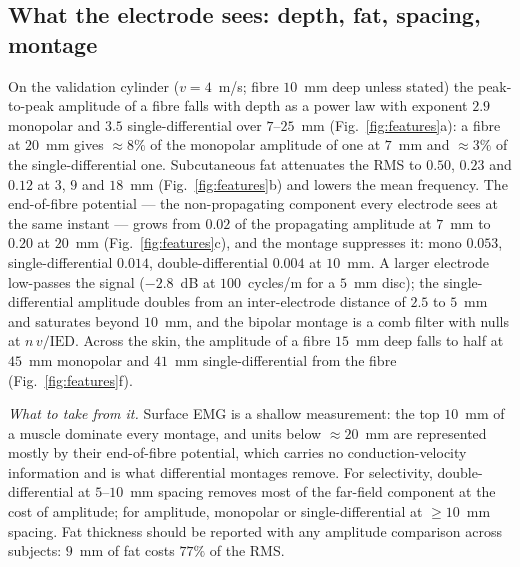 \documentclass[11pt,a4paper]{article}
\begin{document}
\subsection{What the electrode sees: depth, fat, spacing, montage}
\label{sec:study-electrode}
On the validation cylinder ($v = 4$~m/s; fibre $10$~mm deep unless stated) the
peak-to-peak amplitude of a fibre falls with depth as a power law with exponent $2.9$
monopolar and $3.5$ single-differential over $7$--$25$~mm (Fig.~\ref{fig:features}a): a
fibre at $20$~mm gives $\approx8\%$ of the monopolar amplitude of one at $7$~mm and
$\approx3\%$ of the single-differential one. Subcutaneous fat attenuates the RMS to
$0.50$, $0.23$ and $0.12$ at $3$, $9$ and $18$~mm (Fig.~\ref{fig:features}b) and lowers
the mean frequency. The end-of-fibre potential --- the non-propagating component every
electrode sees at the same instant --- grows from $0.02$ of the propagating amplitude at
$7$~mm to $0.20$ at $20$~mm (Fig.~\ref{fig:features}c), and the montage suppresses it:
mono $0.053$, single-differential $0.014$, double-differential $0.004$ at $10$~mm. A
larger electrode low-passes the signal ($-2.8$~dB at $100$~cycles/m for a $5$~mm disc);
the single-differential amplitude doubles from an inter-electrode distance of $2.5$ to
$5$~mm and saturates beyond $10$~mm, and the bipolar montage is a comb filter with nulls
at $n\,v/\mathrm{IED}$. Across the skin, the amplitude of a fibre $15$~mm deep falls to
half at $45$~mm monopolar and $41$~mm single-differential from the fibre
(Fig.~\ref{fig:features}f).

\emph{What to take from it.} Surface EMG is a shallow measurement: the top $10$~mm of a
muscle dominate every montage, and units below $\approx20$~mm are represented mostly by
their end-of-fibre potential, which carries no conduction-velocity information and is
what differential montages remove. For selectivity, double-differential at
$5$--$10$~mm spacing removes most of the far-field component at the cost of amplitude;
for amplitude, monopolar or single-differential at $\geq10$~mm spacing. Fat thickness
should be reported with any amplitude comparison across subjects: $9$~mm of fat costs
$77\%$ of the RMS.
\end{document}
